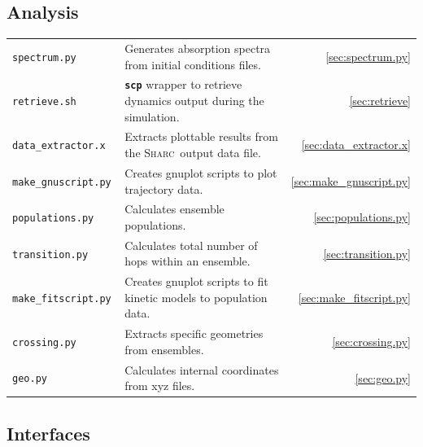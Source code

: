 \documentclass[a4paper,11pt,DIV=15,openany,twoside=false]{scrbook}
\newcommand{\sharc}{\textsc{Sharc}}
\newcommand{\ttt}[1]{\textbf{\texttt{#1}}}
\begin{document}
\subsection{Analysis}

\begin{tabular}{>{\tt}lp{9.5cm}r}
  spectrum.py           &Generates absorption spectra from initial conditions files.            &\ref{sec:spectrum.py}\\
  retrieve.sh           &\ttt{scp} wrapper to retrieve dynamics output during the simulation.   &\ref{sec:retrieve}\\
  data\_extractor.x     &Extracts plottable results from the \sharc\ output data file.          &\ref{sec:data_extractor.x}\\
  make\_gnuscript.py    &Creates gnuplot scripts to plot trajectory data.                       &\ref{sec:make_gnuscript.py}\\
  populations.py        &Calculates ensemble populations.                                       &\ref{sec:populations.py}\\
  transition.py         &Calculates total number of hops within an ensemble.                    &\ref{sec:transition.py}\\
  make\_fitscript.py    &Creates gnuplot scripts to fit kinetic models to population data.      &\ref{sec:make_fitscript.py}\\
  crossing.py           &Extracts specific geometries from ensembles.                           &\ref{sec:crossing.py}\\
  geo.py                &Calculates internal coordinates from xyz files.                        &\ref{sec:geo.py}\\
\end{tabular}

\subsection{Interfaces}
\end{document}
